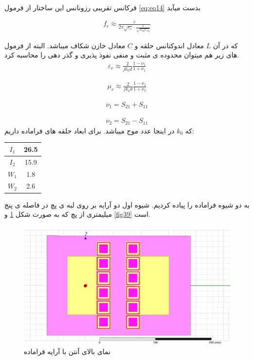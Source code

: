 فرکانس تقریبی رزونانس این ساختار از فرمول 
\eqref{eq:eq14}
 بدست میآید

\begin{align}
	\label{eq:eq14}
	f_r \approx \frac{c}{2\pi\sqrt{\varepsilon_{e}} \cdot \frac{1}{\sqrt{L_{\text{eq}}C_{\text{eq}}}}}
\end{align}

که در آن
$L$
 معادل اندوکتانس حلقه و
 $ C $
 معادل خازن شکاف میباشد. البته از فرمول های زیر هم میتوان محدوده ی مثبت و منفی نفوذ پذیری و گذر دهی را محاسبه کرد.
\begin{align}
	\label{eq:eq15}
	\varepsilon_r \approx \frac{2}{jk_0d}\frac{1-\nu_1}{1+\nu_1}
\end{align}

\begin{align}
	\label{eq:eq15}
	\mu_r \approx \frac{2}{jk_0d}\frac{1-\nu_2}{1+\nu_2}
\end{align}

\begin{align}
	\label{eq:eq15}
	\nu_1=S_{21}+S_{11}
\end{align}


\begin{align}
	\label{eq:eq15}
	\nu_2=S_{21}-S_{11}
\end{align}
که
$ k_0$
 در اینجا عدد موج میباشد.
برای ابعاد حلقه های فراماده داریم:
 \begin{center}
	\begin{tabular}{|c|c|}
		\hline
		$I_1$ & 26.5 \\
		\hline
		$I_2$ & 15.9 \\
		\hline
		$W_1$ & 1.8 \\
		\hline
		$W_2$ & 2.6 \\
		\hline
	\end{tabular}
\end{center}

به دو شیوه فراماده را پیاده کردیم. شیوه اول دو آرایه بر روی لبه ی پچ در فاصله ی پنج میلیمتری از پچ که به صورت شکل
\ref{fig38}
و
\ref{fig39}
است.
\begin{figure}
	\centering
	\includegraphics[scale=0.5]{Images/fig38.png}
	\caption{نمای بالای آنتن با آرایه فراماده}
	\label{fig38}
\end{figure}

